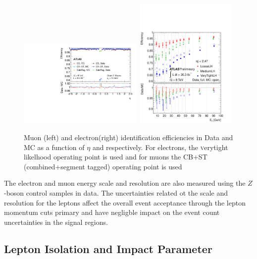 \begin{figure}[htbp]
\begin{center}
\includegraphics[width=0.54\textwidth]{figs/systematics/fig_18a}
\includegraphics[width=0.44\textwidth]{figs/systematics/fig_22a}
\caption{Muon (left) and electron(right) identification efficiencies in Data and MC as a function of $\eta$ and \pt respectively. For electrons, the {\textsc verytight} likelhood operating point is used and for muons the CB+ST (combined+segment tagged) operating point is used}
\label{figure:systematics_lepidsf}
\end{center}
\end{figure}

The electron\cite{EgammaReco} and muon\cite{MuonSF} energy scale and resolution are also measured using the $Z$-boson control samples in data. The uncertainties related ot the scale and resolution for the leptons affect the overall event acceptance through the lepton momentum cuts primary and have negligble impact on the event count uncertainties in the signal regions.

\subsection{Lepton Isolation and Impact Parameter}

